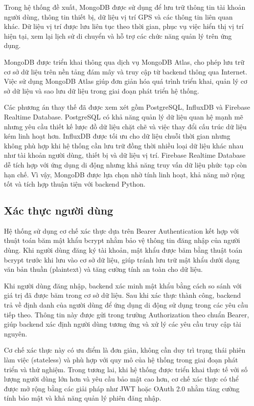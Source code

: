 \documentclass[../DoAn.tex]{subfiles}
\begin{document}
Trong hệ thống đề xuất, MongoDB được sử dụng để lưu trữ thông tin tài khoản người dùng, thông tin thiết bị, dữ liệu vị trí GPS và các thông tin liên quan khác. Dữ liệu vị trí được lưu liên tục theo thời gian, phục vụ việc hiển thị vị trí hiện tại, xem lại lịch sử di chuyển và hỗ trợ các chức năng quản lý trên ứng dụng.

MongoDB được triển khai thông qua dịch vụ MongoDB Atlas, cho phép lưu trữ cơ sở dữ liệu trên nền tảng đám mây và truy cập từ backend thông qua Internet. Việc sử dụng MongoDB Atlas giúp đơn giản hóa quá trình triển khai, quản lý cơ sở dữ liệu và sao lưu dữ liệu trong giai đoạn phát triển hệ thống.

Các phương án thay thế đã được xem xét gồm PostgreSQL, InfluxDB và Firebase Realtime Database. PostgreSQL có khả năng quản lý dữ liệu quan hệ mạnh mẽ nhưng yêu cầu thiết kế lược đồ dữ liệu chặt chẽ và việc thay đổi cấu trúc dữ liệu kém linh hoạt hơn. InfluxDB được tối ưu cho dữ liệu chuỗi thời gian nhưng không phù hợp khi hệ thống cần lưu trữ đồng thời nhiều loại dữ liệu khác nhau như tài khoản người dùng, thiết bị và dữ liệu vị trí. Firebase Realtime Database dễ tích hợp với ứng dụng di động nhưng khả năng truy vấn dữ liệu phức tạp còn hạn chế. Vì vậy, MongoDB được lựa chọn nhờ tính linh hoạt, khả năng mở rộng tốt và tích hợp thuận tiện với backend Python.

\subsection{Xác thực người dùng}
\label{subsection:3.3.3}

Hệ thống sử dụng cơ chế xác thực dựa trên Bearer Authentication kết hợp với thuật toán băm mật khẩu bcrypt nhằm bảo vệ thông tin đăng nhập của người dùng. Khi người dùng đăng ký tài khoản, mật khẩu được băm bằng thuật toán bcrypt trước khi lưu vào cơ sở dữ liệu, giúp tránh lưu trữ mật khẩu dưới dạng văn bản thuần (plaintext) và tăng cường tính an toàn cho dữ liệu.

Khi người dùng đăng nhập, backend xác minh mật khẩu bằng cách so sánh với giá trị đã được băm trong cơ sở dữ liệu. Sau khi xác thực thành công, backend trả về định danh của người dùng để ứng dụng di động sử dụng trong các yêu cầu tiếp theo. Thông tin này được gửi trong trường Authorization theo chuẩn Bearer, giúp backend xác định người dùng tương ứng và xử lý các yêu cầu truy cập tài nguyên.

Cơ chế xác thực này có ưu điểm là đơn giản, không cần duy trì trạng thái phiên làm việc (stateless) và phù hợp với quy mô của hệ thống trong giai đoạn phát triển và thử nghiệm. Trong tương lai, khi hệ thống được triển khai thực tế với số lượng người dùng lớn hơn và yêu cầu bảo mật cao hơn, cơ chế xác thực có thể được mở rộng bằng các giải pháp như JWT hoặc OAuth 2.0 nhằm tăng cường tính bảo mật và khả năng quản lý phiên đăng nhập.
\end{document}
